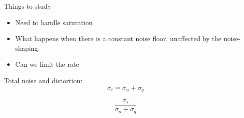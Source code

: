 \documentclass[a4paper]{article}
\begin{document}
Things to study
\begin{itemize}
    \item Need to handle saturation
    \item What happens when there is a constant noise floor, unaffected by the noise-shaping
    \item Can we limit the rate
\end{itemize}

Total noise and distortion:
$$
\sigma_t = \sigma_n + \sigma_q
$$

$$
\frac{\sigma_s}{\sigma_n + \sigma_q}
$$
\end{document}
